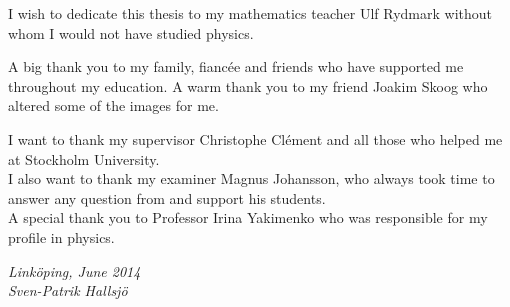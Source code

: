 \begin{acknowledgments}

I wish to dedicate this thesis to my mathematics teacher Ulf Rydmark without whom I would not have studied physics.

A big thank you to my family, fiancée and friends who have supported me throughout my education. A warm thank you to my friend Joakim Skoog who altered some of the images for me.

I want to thank my supervisor Christophe Clément and all those who helped me at Stockholm University. \\
I also want to thank my examiner Magnus Johansson, who always took time to answer any question from and support his students. \\ 
A special thank you to Professor Irina Yakimenko who was responsible for my profile in physics.


  \addvspace{1em}
  \begin{flushright}
    \textit{%
      Linköping, June 2014\\
      Sven-Patrik Hallsjö%
    }
  \end{flushright}
\end{acknowledgments}
